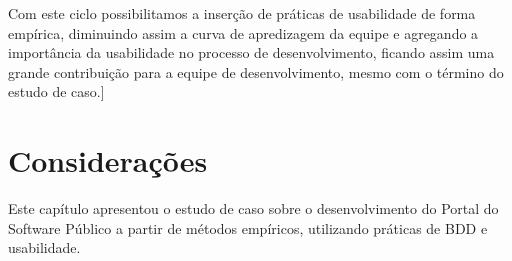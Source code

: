 Com este ciclo possibilitamos a inserção de práticas de usabilidade de forma empírica, diminuindo assim a curva de apredizagem da equipe e agregando a importância da usabilidade no processo de desenvolvimento, ficando assim uma grande contribuição para a equipe de desenvolvimento, mesmo com o término do estudo de caso.]

\section{Considerações}

Este capítulo apresentou o estudo de caso sobre o desenvolvimento do Portal do Software Público a partir de métodos empíricos, utilizando práticas de BDD e usabilidade.

